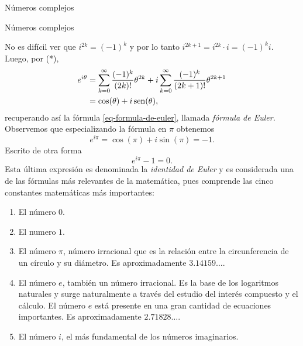 \begin{chapter}{N\'umeros complejos}
\begin{section}{N\'umeros complejos}
\begin{observacion*}
        No es difícil ver que $i^{2k} = (-1)^k$ y por lo tanto $i^{2k+1} = i^{2k}\cdot i = (-1)^ki $. Luego, por (*), 
        \begin{align*}
            e^{i\theta} &=  \sum_{k=0}^{\infty} \frac{(-1)^k}{(2k)!}\theta^{2k}  + i\sum_{k=0}^{\infty} \frac{ (-1)^k}{(2k+1)!}\theta^{2k+1} \\
            &=\cos(\theta) + i \operatorname{sen}(\theta), 
        \end{align*}
        recuperando así  la fórmula \eqref{eq-formula-de-euler}, llamada \emph{fórmula de Euler.} Observemos que especializando la fórmula en $\pi$ obtenemos 
        \begin{equation*}
                e^{i\pi} = \cos(\pi) + i\sin(\pi) = -1.
        \end{equation*}
        Escrito de otra forma
        \begin{equation}
            e^{i\pi} -1 =0.
        \end{equation}
        Esta última expresión es denominada la \emph{identidad de Euler} y es considerada una de las fórmulas más relevantes de la matemática, pues comprende las cinco constantes matemáticas más importantes: 
        \begin{enumerate}
            \item El número \boldmath${0}$.
            \item El numero \boldmath${1}$.
            \item El número \boldmath${\pi}$, número irracional  que es la relación entre la circunferencia de un círculo y su diámetro. Es aproximadamente $3.14159\ldots$.
            \item El número \boldmath${e}$, también un número irracional. Es la base de los logaritmos naturales y surge naturalmente a través del estudio del interés compuesto y el cálculo. El número $e$ está presente en una gran cantidad de ecuaciones importantes. Es aproximadamente $2.71828\ldots$.
            \item El número \boldmath$i$, el más fundamental de los números imaginarios.
            
        \end{enumerate}
        
        
        \end{observacion*}
        
        
        
    \end{section}	
    \end{chapter}




